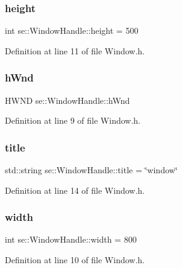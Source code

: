 \subsubsection{\texorpdfstring{height}{height}}
{\footnotesize\ttfamily int se\+::\+Window\+Handle\+::height = 500}



Definition at line 11 of file Window.\+h.

\mbox{\label{structse_1_1_window_handle_a1466230e9f6cf80e20f6cb35bac7effe}} 
\subsubsection{\texorpdfstring{h\+Wnd}{hWnd}}
{\footnotesize\ttfamily H\+W\+ND se\+::\+Window\+Handle\+::h\+Wnd}



Definition at line 9 of file Window.\+h.

\mbox{\label{structse_1_1_window_handle_ab27997307c0b25e2736050727d393ca8}} 
\subsubsection{\texorpdfstring{title}{title}}
{\footnotesize\ttfamily std\+::string se\+::\+Window\+Handle\+::title = \char`\"{}window\char`\"{}}



Definition at line 14 of file Window.\+h.

\mbox{\label{structse_1_1_window_handle_a66814701369b6e581dcaa3d3ac468f5e}} 
\subsubsection{\texorpdfstring{width}{width}}
{\footnotesize\ttfamily int se\+::\+Window\+Handle\+::width = 800}



Definition at line 10 of file Window.\+h.

